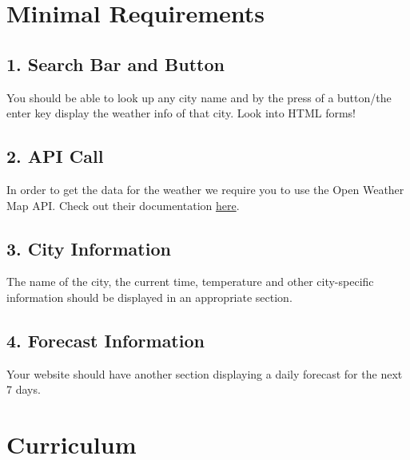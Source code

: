 \documentclass[
]{book}
\begin{document}
\hypertarget{minimal-requirements}{%
\section{Minimal Requirements}\label{minimal-requirements}}

\hypertarget{search-bar-and-button}{%
\subsection*{1. Search Bar and Button}\label{search-bar-and-button}}

You should be able to look up any city name and by the press of a button/the enter key display the weather info of that city. Look into HTML forms!

\hypertarget{api-call}{%
\subsection*{2. API Call}\label{api-call}}

In order to get the data for the weather we require you to use the Open Weather Map API. Check out their documentation \href{https://openweathermap.org/appid}{here}.

\hypertarget{city-information}{%
\subsection*{3. City Information}\label{city-information}}

The name of the city, the current time, temperature and other city-specific information should be displayed in an appropriate section.

\hypertarget{forecast-information}{%
\subsection*{4. Forecast Information}\label{forecast-information}}

Your website should have another section displaying a daily forecast for the next 7 days.

\hypertarget{curriculum}{%
\section{Curriculum}\label{curriculum}}
\end{document}
